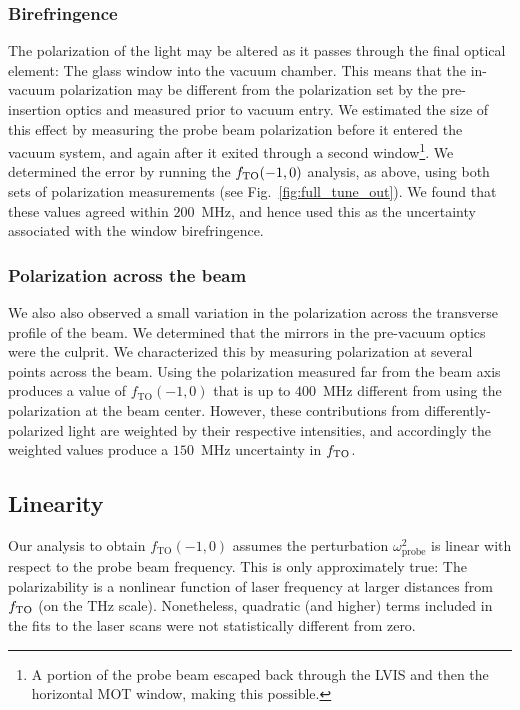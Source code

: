 \subsubsection{Birefringence}
	
	The polarization of the light may be altered as it passes through the final optical element: The glass window into the vacuum chamber.
	This means that the in-vacuum polarization may be different from the polarization set by the pre-insertion optics and measured prior to vacuum entry.
 	We estimated the size of this effect by measuring the probe beam polarization before it entered the vacuum system, and again after it exited through a second window\footnote{A portion of the probe beam escaped back through the LVIS and then the horizontal MOT window, making this possible.}.
 	We determined the error by running the $f_\mathrm{TO}(-1,0)$ analysis, as above, using both sets of polarization measurements (see Fig.~\ref{fig:full_tune_out}). 
 	We found that these values agreed within \(200\)~MHz, and hence used this as the uncertainty associated with the window birefringence. 

\subsubsection{Polarization across the beam}

	We also also observed a small variation in the polarization across the transverse profile of the beam.
	We determined that the mirrors in the pre-vacuum optics were the culprit.
	We characterized this by measuring polarization at several points across the beam.
	Using the polarization measured far from the beam axis produces a value of \(f_{\mathrm{TO}}(-1,0)\) that is up to \(400\)~MHz different from using the polarization at the beam center. 
	However, these contributions from differently-polarized light are weighted by their respective intensities, and accordingly the  weighted values produce a \(150\)~MHz uncertainty in $f_\mathrm{TO}$.

\subsection{Linearity} \label{sec:syst.subsec:lin}

	Our analysis to obtain \(f_{\mathrm{TO}}(-1,0)\) assumes the perturbation $\omega_\mathrm{probe}^2$ is linear with respect to the probe beam frequency. 
	This is only approximately true: The polarizability is a nonlinear function of laser frequency at larger distances from $f_\mathrm{TO}$ (on the THz scale). 
	Nonetheless, quadratic (and higher) terms included in the fits to the laser scans were not statistically different from zero.

